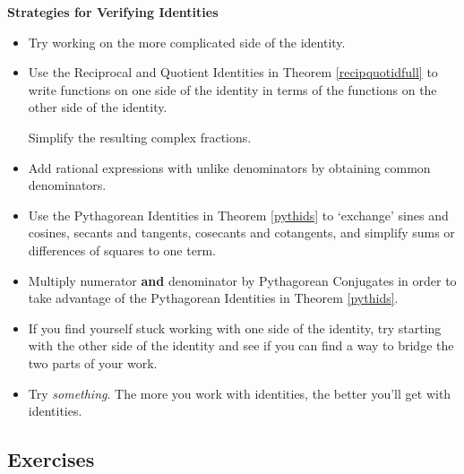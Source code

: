 \label{IdentityHelp}

\colorbox{ResultColor}{\bbm

\medskip

\centerline{\textbf{Strategies for Verifying Identities}} 

\begin{itemize}

\item  Try working on the more complicated side of the identity.

\item Use the Reciprocal and Quotient Identities in Theorem \ref{recipquotidfull} to write functions on one side of the identity in terms of the functions on the other side of the identity.  

\smallskip

Simplify the resulting complex fractions.

\item Add rational expressions with unlike denominators by obtaining common denominators.

\item  Use the Pythagorean Identities in Theorem \ref{pythids} to `exchange' sines and cosines, secants and tangents, cosecants and cotangents, and simplify sums or differences of squares to one term. 

\item Multiply numerator \textbf{and} denominator by Pythagorean
Conjugates in order to take advantage of the Pythagorean Identities in  Theorem \ref{pythids}.

\item If you find yourself stuck working with one side of the identity, try starting with the other side of the identity and see if you can find a way to bridge the two parts of your work.

\item  Try \textit{something}.  The more you work with identities, the better you'll get with identities.

\smallskip


\end{itemize}

\ebm}

\newpage

\subsection{Exercises}




\closegraphsfile